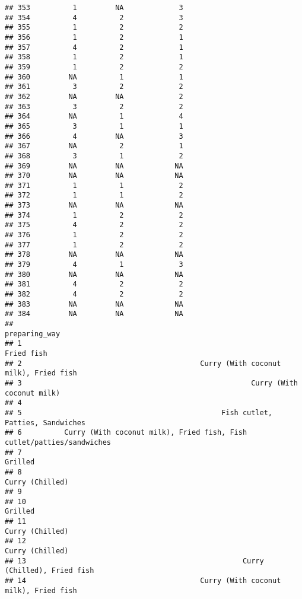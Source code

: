\documentclass[
]{article}
\begin{document}
\begin{verbatim}
## 353          1         NA             3
## 354          4          2             3
## 355          1          2             2
## 356          1          2             1
## 357          4          2             1
## 358          1          2             1
## 359          1          2             2
## 360         NA          1             1
## 361          3          2             2
## 362         NA         NA             2
## 363          3          2             2
## 364         NA          1             4
## 365          3          1             1
## 366          4         NA             3
## 367         NA          2             1
## 368          3          1             2
## 369         NA         NA            NA
## 370         NA         NA            NA
## 371          1          1             2
## 372          1          1             2
## 373         NA         NA            NA
## 374          1          2             2
## 375          4          2             2
## 376          1          2             2
## 377          1          2             2
## 378         NA         NA            NA
## 379          4          1             3
## 380         NA         NA            NA
## 381          4          2             2
## 382          4          2             2
## 383         NA         NA            NA
## 384         NA         NA            NA
##                                                                    preparing_way
## 1                                                                     Fried fish
## 2                                          Curry (With coconut milk), Fried fish
## 3                                                      Curry (With coconut milk)
## 4                                                                               
## 5                                               Fish cutlet, Patties, Sandwiches
## 6          Curry (With coconut milk), Fried fish, Fish cutlet/patties/sandwiches
## 7                                                                        Grilled
## 8                                                                Curry (Chilled)
## 9                                                                               
## 10                                                                       Grilled
## 11                                                               Curry (Chilled)
## 12                                                               Curry (Chilled)
## 13                                                   Curry (Chilled), Fried fish
## 14                                         Curry (With coconut milk), Fried fish

\end{verbatim}
\end{document}
